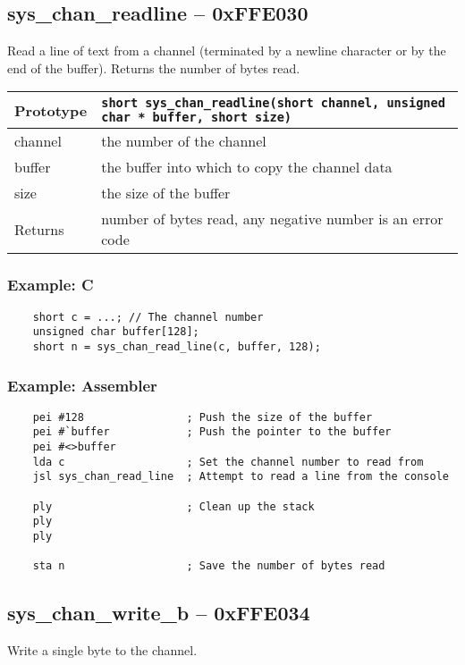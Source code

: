 \subsection*{sys\_chan\_readline -- 0xFFE030}
Read a line of text from a channel (terminated by a newline character or by the end of the buffer). Returns the number of bytes read.

\bigskip

\begin{tabular}{|l||l|} \hline
Prototype & \lstinline!short sys_chan_readline(short channel, unsigned char * buffer, short size)! \\ \hline
channel & the number of the channel \\ \hline
buffer & the buffer into which to copy the channel data \\ \hline
size & the size of the buffer \\ \hline
Returns & number of bytes read, any negative number is an error code \\ \hline
\end{tabular}

\subsubsection*{Example: C}
\begin{lstlisting}
    short c = ...; // The channel number
    unsigned char buffer[128];
    short n = sys_chan_read_line(c, buffer, 128);    
\end{lstlisting}

\subsubsection*{Example: Assembler}
\begin{verbatim}
    pei #128                ; Push the size of the buffer
    pei #`buffer            ; Push the pointer to the buffer
    pei #<>buffer
    lda c                   ; Set the channel number to read from
    jsl sys_chan_read_line  ; Attempt to read a line from the console

    ply                     ; Clean up the stack
    ply
    ply

    sta n                   ; Save the number of bytes read
\end{verbatim}

\subsection*{sys\_chan\_write\_b -- 0xFFE034}
Write a single byte to the channel.

